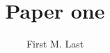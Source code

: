 \documentclass[11pt, titlepage]{article}
\title{Paper one}
\author{First M. Last}
\date{2016
  \vfill
  \singlespacing
  \begin{center}
    Pre-print of paper published in {\itshape Journal of Academic
      Studies and Work}, 45(2), 30–45.
  \end{center}}
\begin{document}
\maketitle

\begin{abstract}
 \lipsum[1]
\end{abstract}

\clearpage

\lipsum[2-50]

\end{document}
